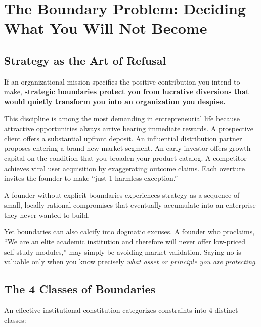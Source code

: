 \section{The Boundary Problem: Deciding What You Will Not Become}

\subsection{Strategy as the Art of Refusal}

If an organizational mission specifies the positive contribution you intend to make, \textbf{strategic boundaries protect you from lucrative diversions that would quietly transform you into an organization you despise.}

This discipline is among the most demanding in entrepreneurial life because attractive opportunities always arrive bearing immediate rewards. A prospective client offers a substantial upfront deposit. An influential distribution partner proposes entering a brand-new market segment. An early investor offers growth capital on the condition that you broaden your product catalog. A competitor achieves viral user acquisition by exaggerating outcome claims. Each overture invites the founder to make ``just 1 harmless exception.''

A founder without explicit boundaries experiences strategy as a sequence of small, locally rational compromises that eventually accumulate into an enterprise they never wanted to build.

Yet boundaries can also calcify into dogmatic excuses. A founder who proclaims, ``We are an elite academic institution and therefore will never offer low-priced self-study modules,'' may simply be avoiding market validation. Saying no is valuable only when you know precisely \textit{what asset or principle you are protecting}.

\subsection{The 4 Classes of Boundaries}

An effective institutional constitution categorizes constraints into 4 distinct classes:

